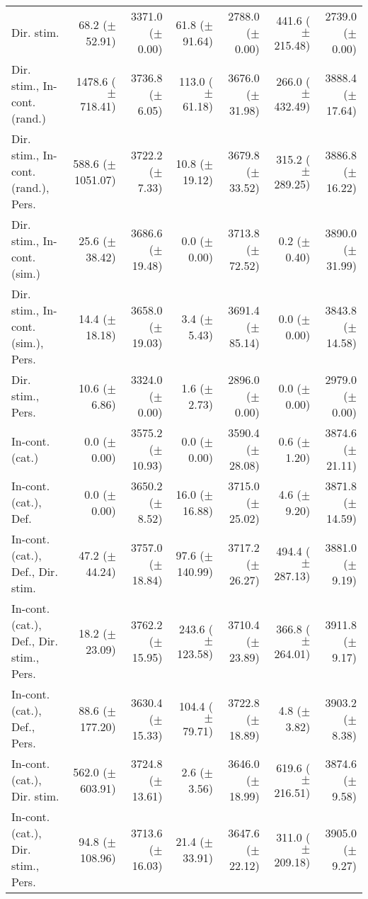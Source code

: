 \begin{table*}
\begin{tabular}{lrrrrrr}
        Dir. stim. & 68.2 ($\pm$ 52.91) & 3371.0 ($\pm$ 0.00) & 61.8 ($\pm$ 91.64) & 2788.0 ($\pm$ 0.00) & 441.6 ($\pm$ 215.48) & 2739.0 ($\pm$ 0.00) \\
        Dir. stim., In-cont. (rand.) & 1478.6 ($\pm$ 718.41) & 3736.8 ($\pm$ 6.05) & 113.0 ($\pm$ 61.18) & 3676.0 ($\pm$ 31.98) & 266.0 ($\pm$ 432.49) & 3888.4 ($\pm$ 17.64) \\
        Dir. stim., In-cont. (rand.), Pers. & 588.6 ($\pm$ 1051.07) & 3722.2 ($\pm$ 7.33) & 10.8 ($\pm$ 19.12) & 3679.8 ($\pm$ 33.52) & 315.2 ($\pm$ 289.25) & 3886.8 ($\pm$ 16.22) \\
        Dir. stim., In-cont. (sim.) & 25.6 ($\pm$ 38.42) & 3686.6 ($\pm$ 19.48) & 0.0 ($\pm$ 0.00) & 3713.8 ($\pm$ 72.52) & 0.2 ($\pm$ 0.40) & 3890.0 ($\pm$ 31.99) \\
        Dir. stim., In-cont. (sim.), Pers. & 14.4 ($\pm$ 18.18) & 3658.0 ($\pm$ 19.03) & 3.4 ($\pm$ 5.43) & 3691.4 ($\pm$ 85.14) & 0.0 ($\pm$ 0.00) & 3843.8 ($\pm$ 14.58) \\
        Dir. stim., Pers. & 10.6 ($\pm$ 6.86) & 3324.0 ($\pm$ 0.00) & 1.6 ($\pm$ 2.73) & 2896.0 ($\pm$ 0.00) & 0.0 ($\pm$ 0.00) & 2979.0 ($\pm$ 0.00) \\
        In-cont. (cat.) & 0.0 ($\pm$ 0.00) & 3575.2 ($\pm$ 10.93) & 0.0 ($\pm$ 0.00) & 3590.4 ($\pm$ 28.08) & 0.6 ($\pm$ 1.20) & 3874.6 ($\pm$ 21.11) \\
        In-cont. (cat.), Def. & 0.0 ($\pm$ 0.00) & 3650.2 ($\pm$ 8.52) & 16.0 ($\pm$ 16.88) & 3715.0 ($\pm$ 25.02) & 4.6 ($\pm$ 9.20) & 3871.8 ($\pm$ 14.59) \\
        In-cont. (cat.), Def., Dir. stim. & 47.2 ($\pm$ 44.24) & 3757.0 ($\pm$ 18.84) & 97.6 ($\pm$ 140.99) & 3717.2 ($\pm$ 26.27) & 494.4 ($\pm$ 287.13) & 3881.0 ($\pm$ 9.19) \\
        In-cont. (cat.), Def., Dir. stim., Pers. & 18.2 ($\pm$ 23.09) & 3762.2 ($\pm$ 15.95) & 243.6 ($\pm$ 123.58) & 3710.4 ($\pm$ 23.89) & 366.8 ($\pm$ 264.01) & 3911.8 ($\pm$ 9.17) \\
        In-cont. (cat.), Def., Pers. & 88.6 ($\pm$ 177.20) & 3630.4 ($\pm$ 15.33) & 104.4 ($\pm$ 79.71) & 3722.8 ($\pm$ 18.89) & 4.8 ($\pm$ 3.82) & 3903.2 ($\pm$ 8.38) \\
        In-cont. (cat.), Dir. stim. & 562.0 ($\pm$ 603.91) & 3724.8 ($\pm$ 13.61) & 2.6 ($\pm$ 3.56) & 3646.0 ($\pm$ 18.99) & 619.6 ($\pm$ 216.51) & 3874.6 ($\pm$ 9.58) \\
        In-cont. (cat.), Dir. stim., Pers. & 94.8 ($\pm$ 108.96) & 3713.6 ($\pm$ 16.03) & 21.4 ($\pm$ 33.91) & 3647.6 ($\pm$ 22.12) & 311.0 ($\pm$ 209.18) & 3905.0 ($\pm$ 9.27) \\

\end{tabular}
\end{table*}
